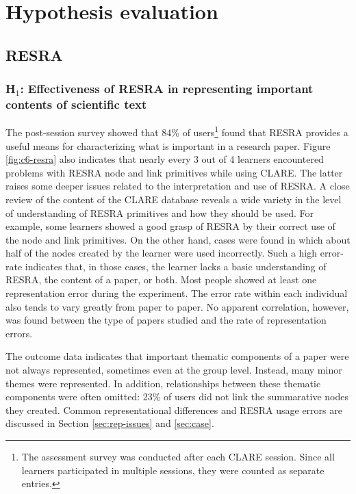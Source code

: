 \section{Hypothesis evaluation}
\label{sec:c6-hypothesis}

\subsection{RESRA}
\label{sec:c6-resra-hypothesis}

\subsubsection{H\(_1\): Effectiveness of RESRA in representing important
contents of scientific text}

The post-session survey showed that 84\% of users\footnote{The assessment
survey was conducted after each CLARE session. Since all learners
participated in multiple sessions, they were counted as separate entries.}
found that RESRA provides a useful means for characterizing what is
important in a research paper. Figure \ref{fig:c6-resra} also indicates
that nearly every 3 out of 4 learners encountered problems with RESRA node
and link primitives while using CLARE. The latter raises some deeper issues
related to the interpretation and use of RESRA.  A close review of the
content of the CLARE database reveals a wide variety in the level of
understanding of RESRA primitives and how they should be used. For example,
some learners showed a good grasp of RESRA by their correct use of the node
and link primitives. On the other hand, cases were found in which about
half of the nodes created by the learner were used incorrectly.  Such a
high error-rate indicates that, in those cases, the learner lacks a basic
understanding of RESRA, the content of a paper, or both. Most people showed
at least one representation error during the experiment. The error rate
within each individual also tends to vary greatly from paper to paper.  No
apparent correlation, however, was found between the type of papers studied
and the rate of representation errors.

The outcome data indicates that important thematic components of a paper
were not always represented, sometimes even at the group level. Instead,
many minor themes were represented. In addition, relationships between
these thematic components were often omitted: 23\% of users did not link
the summarative nodes they created. Common representational differences and
RESRA usage errors are discussed in Section \ref{sec:rep-issues} and
\ref{sec:case}.

